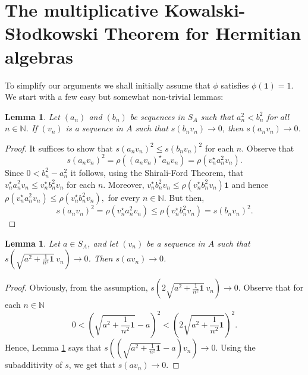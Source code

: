 \documentclass{amsart}
\newtheorem{lemma}[theorem]{Lemma}
\theoremstyle{definition}
\theoremstyle{remark}
\newcommand{\identity}{\mathbf{1}}
\begin{document}
	

		 
		 
	\section{The multiplicative Kowalski-S\l{}odkowski Theorem for Hermitian algebras}
To simplify our arguments we shall initially assume that $\phi$ satisfies $\phi(\identity)=1$. We start with a few easy but somewhat non-trivial lemmas: 
	 
	\begin{lemma}\label{lem:1}
		Let $\left(a_n\right)$ and $\left(b_n\right)$ be sequences in $S_A$ such that $a_n^2 < b_n^2$ for all $n\in \mathbb{N}$. If $\left(v_n\right)$ is a sequence in $A$ such that $s(b_nv_n)\to 0$, then $s(a_nv_n)\to 0$.
	\end{lemma}
	\begin{proof}
		It suffices to show that $s(a_nv_n)^2\leq s(b_nv_n)^2$ for each $n$. Observe that
		$$s(a_nv_n)^2=\rho((a_nv_n)^\star a_nv_n)=\rho(v_n^\star a_n^2 v_n).$$
		Since $0<b_n^2-a_n^2$ it follows, using the Shirali-Ford Theorem, that $v_n^\star a_n^2 v_n \leq v_n^\star b_n^2 v_n $ for each $n$. Moreover, $v_n^\star b_n^2 v_n \leq \rho(v_n^\star b_n^2 v_n) \identity$ and hence
		$\rho(v_n^\star a_n^2 v_n)\leq \rho(v_n^\star b_n^2 v_n),$ for every $n\in\mathbb{N}.$
		But then, $$s(a_nv_n)^2=\rho(v_n^\star a_n^2 v_n) \leq \rho(v_n^\star b_n^2 v_n) = s(b_nv_n)^2.$$
	\end{proof}


	\begin{lemma}\label{lem:2}
			Let $a\in S_A$, and let $(v_n)$ be a sequence in $A$ such that $s\left(\sqrt{a^2+\frac{1}{n^2}\mathbf 1}\, v_n\right)\to 0$. Then $s(av_n)\to 0$.
	\end{lemma}
	\begin{proof}
		Obviously, from the assumption, $s\left(2\sqrt{a^2+\frac{1}{n^2}\mathbf 1}\, v_n\right)\to 0$. Observe that for each $n\in\mathbb{N}$
		$$0 < \left(\sqrt{a^2+\frac{1}{n^2}\mathbf 1}-a\right)^2 < \left(2\sqrt{a^2+\frac{1}{n^2}\mathbf 1}\right)^2.$$
		Hence, Lemma \ref{lem:1} says that $s\left(\left(\sqrt{a^2+\frac{1}{n^2}\mathbf 1}-a\right)v_n \right)\to 0$. Using the subadditivity of $s$, we get that $s(av_n)\to 0$.
	\end{proof}
	
\end{document}
